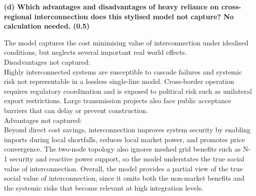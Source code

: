 \textbf{
    (d) Which advantages and disadvantages of heavy reliance on cross-regional interconnection does this stylised model not capture? No calculation needed. (0.5)
    }

The model captures the cost minimising value of interconnection under idealised conditions, but neglects several important real world effects. \\
Disadvantages not captured: \\
Highly interconnected systems are susceptible to cascade failures and systemic risk not representable in a lossless single-line model. Cross-border operation requires regulatory coordination and is exposed to political risk such as unilateral export restrictions. Large transmission projects also face public acceptance barriers that can delay or prevent construction. \\
Advantages not captured: \\
Beyond direct cost savings, interconnection improves system security by enabling imports during local shortfalls, reduces local market power, and promotes price convergence. The two-node topology also ignores meshed grid benefits such as N-1 security and reactive power support, so the model understates the true social value of interconnection.
Overall, the model provides a partial view of the true social value of interconnection, since it omits both the non-market benefits and the systemic risks that become relevant at high integration levels.